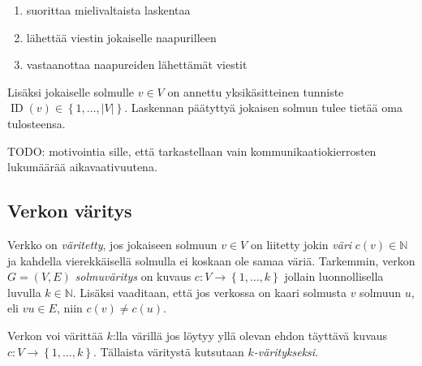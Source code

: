 \documentclass[finnish]{tktltiki2}
\theoremstyle{definition}
\theoremstyle{remark}
\newcommand{\set}[1]{\left\{ #1 \right\}}
\newcommand{\nat}{\mathbb{N}}
\DeclareMathOperator{\id}{ID}
\begin{document}
\begin{enumerate}
    \item suorittaa mielivaltaista laskentaa
    \item lähettää viestin jokaiselle naapurilleen
    \item vastaanottaa naapureiden lähettämät viestit
\end{enumerate}

Lisäksi jokaiselle solmulle $v \in V$ on annettu yksikäsitteinen tunniste
$\id(v) \in \set{1,\dots,|V|}$. Laskennan päätyttyä jokaisen solmun tulee
tietää oma tulosteensa.

TODO: motivointia sille, että tarkastellaan vain kommunikaatiokierrosten
lukumäärää aikavaativuutena.

\subsection{Verkon väritys}

Verkko on \emph{väritetty}, jos jokaiseen solmuun $v \in V$ on liitetty jokin
\emph{väri} $c(v) \in \nat$ ja kahdella vierekkäisellä solmulla ei koskaan ole
samaa väriä.  Tarkemmin, verkon $G = (V,E)$ \emph{solmuväritys} on kuvaus $c :
V \rightarrow \set{1,\dots,k}$ jollain luonnollisella luvulla $k \in \nat$.
Lisäksi vaaditaan, että jos verkossa on kaari solmusta $v$ solmuun $u$, eli $vu
\in E$, niin $c(v) \neq c(u)$.

Verkon voi värittää $k$:lla värillä jos löytyy yllä olevan ehdon täyttävä
kuvaus $c : V \rightarrow \set{1,\dots,k}$. Tällaista väritystä kutsutaan
\emph{$k$-väritykseksi}.


\begin{center}
\end{center}
\end{document}
